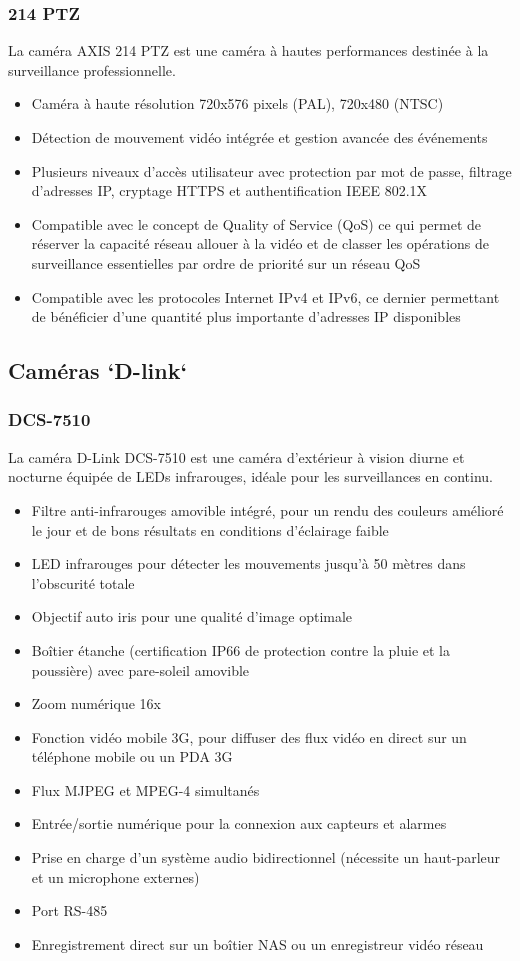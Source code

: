 \subsubsection{214 PTZ}
La caméra AXIS 214 PTZ est une caméra à hautes performances destinée à la
surveillance professionnelle.
\begin{itemize}
  \item Caméra à haute résolution 720x576 pixels (PAL), 720x480 (NTSC)
  \item Détection de mouvement vidéo intégrée et gestion avancée des événements
  \item Plusieurs niveaux d’accès utilisateur avec protection par mot de passe,
  filtrage d’adresses IP, cryptage HTTPS et authentification IEEE 802.1X
  \item Compatible avec le concept de Quality of Service (QoS) ce qui permet de
  réserver la capacité réseau allouer à la vidéo et de classer les opérations de
  surveillance essentielles par ordre de priorité sur un réseau QoS
  \item Compatible avec les protocoles Internet IPv4 et IPv6, ce dernier permettant
  de bénéficier d’une quantité plus importante d’adresses IP disponibles
\end{itemize}
\subsection{Caméras `D-link`}
\subsubsection{DCS-7510}
La caméra D-Link DCS-7510 est une caméra d'extérieur à vision diurne et
nocturne équipée de LEDs infrarouges, idéale pour les surveillances en continu.
\begin{itemize}
  \item Filtre anti-infrarouges amovible intégré, pour un rendu des couleurs amélioré
  le jour et de bons résultats en conditions d'éclairage faible
  \item LED infrarouges
  pour détecter les mouvements jusqu'à 50 mètres dans l'obscurité totale
  \item Objectif auto iris pour une qualité d’image optimale
  \item Boîtier étanche (certification IP66 de protection contre la pluie et la
  poussière) avec pare-soleil amovible
  \item Zoom numérique 16x
  \item Fonction vidéo mobile 3G, pour diffuser des flux vidéo en direct sur un
  téléphone mobile ou un PDA 3G
  \item Flux MJPEG et MPEG-4 simultanés
  \item Entrée/sortie numérique pour la connexion aux capteurs et alarmes
  \item Prise en charge d'un système audio bidirectionnel (nécessite un haut-parleur
  et un microphone externes)
  \item Port RS-485
  \item Enregistrement direct sur un boîtier NAS ou un enregistreur vidéo réseau
\end{itemize}
